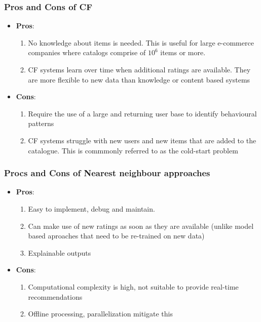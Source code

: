 \documentclass{article}
\begin{document}
\subsubsection{Pros and Cons of CF}
\begin{itemize}
    \item \textbf{Pros}: 
    \begin{enumerate}
        \item No knowledge about items is needed. This is useful for large e-commerce companies where catalogs comprise of $10^6$ items or more.
        
        \item CF systems learn over time when additional ratings are available. They are more flexible to new data than knowledge or content based systems
    \end{enumerate}
    
    \item \textbf{Cons}:
    \begin{enumerate}
        \item Require the use of a large and returning user base to identify behavioural patterns
        
        \item CF systems struggle with new users and new items that are added to the catalogue. This is commmonly referred to as the cold-start problem
    \end{enumerate}
\end{itemize}

\subsubsection{Procs and Cons of Nearest neighbour approaches}
\begin{itemize}
    \item \textbf{Pros}:
    \begin{enumerate}
        \item Easy to implement, debug and maintain. 
        
        \item Can make use of new ratings as soon as they are available (unlike model based aproaches that need to be re-trained on new data)
        
        \item Explainable outputs
    \end{enumerate}
    
    \item \textbf{Cons}:
    \begin{enumerate}
        \item Computational complexity is high, not suitable to provide real-time recommendations
        
        \item Offline processing, parallelization mitigate this
    \end{enumerate}
\end{itemize}
\end{document}
